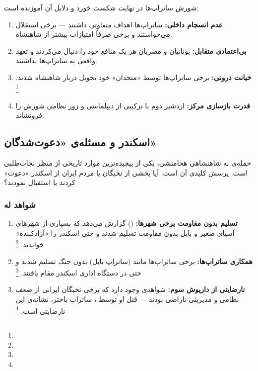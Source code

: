 \begin{tcolorbox}[enemybox, title={الگوی شکست: شورش ساتراپ‌ها}]
شورش ساتراپ‌ها در نهایت شکست خورد و دلایل آن آموزنده است:
\begin{enumerate}[nosep, label=\textbf{\arabic*.}]
  \item \textbf{عدم انسجام داخلی:} ساتراپ‌ها اهداف متفاوتی داشتند — برخی استقلال می‌خواستند و برخی صرفاً امتیازات بیشتر از شاهنشاه.
  \item \textbf{بی‌اعتمادی متقابل:} یونانیان و مصریان هر یک منافع خود را دنبال می‌کردند و تعهد واقعی به ساتراپ‌ها نداشتند.
  \item \textbf{خیانت درونی:} برخی ساتراپ‌ها توسط «متحدان» خود تحویل دربار شاهنشاه شدند.%
  \footnote{}
  \item \textbf{قدرت بازسازی مرکز:} اردشیر دوم با ترکیبی از دیپلماسی و زور نظامی شورش را فرونشاند.
\end{enumerate}
\end{tcolorbox}

\subsection{اسکندر و مسئله‌ی «دعوت‌شدگان»}
\label{subsec:ch04-alexander}

حمله‌ی  به شاهنشاهی هخامنشی، یکی از پیچیده‌ترین موارد تاریخی از منظر نجات‌طلبی است. پرسش کلیدی آن است: آیا بخشی از نخبگان یا مردم ایران از اسکندر «دعوت» کردند یا استقبال نمودند؟

\subsubsection{شواهد له}

\begin{enumerate}[nosep, label=\textbf{\arabic*.}]
  \item \textbf{تسلیم بدون مقاومت برخی شهرها:}  () گزارش می‌دهد که بسیاری از شهرهای آسیای صغیر و بابل بدون مقاومت تسلیم شدند و حتی اسکندر را «آزادکننده» خواندند.%
  \footnote{}
  \item \textbf{همکاری ساتراپ‌ها:} برخی ساتراپ‌ها مانند  (ساتراپ بابل) بدون جنگ تسلیم شدند و حتی در دستگاه اداری اسکندر مقام یافتند.%
  \footnote{}
  \item \textbf{نارضایتی از داریوش سوم:} شواهدی وجود دارد که برخی نخبگان ایرانی از ضعف نظامی و مدیریتی  ناراضی بودند — قتل او توسط ، ساتراپ باختر، نشانه‌ی این نارضایتی است.%
  \footnote{}
\end{enumerate}

